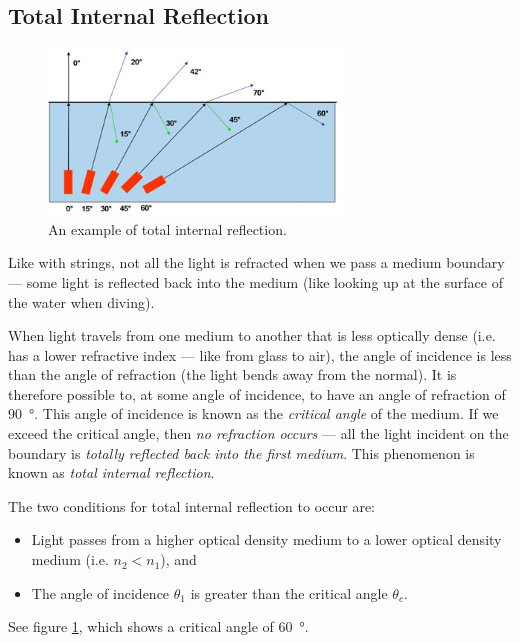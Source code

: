\documentclass[a4paper]{amsbook}
\newcommand\capcite[1]{}
\begin{document}
\subsection{Total Internal Reflection}
\begin{figure}
  \centering
  \includegraphics[width=0.7\textwidth]{criticalangle}
  \caption{An example of total internal reflection. \capcite{http://www.timbercon.com/assets/Uploads/fiber-optic-glossary/images/Critical-Angle.jpg}\label{fig:tire}}
\end{figure}
Like with strings, not all the light is refracted when we pass a medium boundary --- some light is reflected back into
the medium (like looking up at the surface of the water when diving).

When light travels from one medium to another that is less optically dense (i.e. has a lower refractive index --- like from glass to air),
the angle of incidence is less than the angle of refraction (the light bends away from the normal). It is therefore possible to, at some
angle of incidence, to have an angle of refraction of \SI{90}{\degree}. This angle of incidence is known as the \textit{critical angle}
of the medium. If we exceed the critical angle, then \textit{no refraction occurs} --- all the light incident on the boundary is \textit{totally
reflected back into the first medium}. This phenomenon is known as \textit{total internal reflection}.

The two conditions for total internal reflection to occur are:
\begin{itemize}
  \item Light passes from a higher optical density medium to a lower optical density medium (i.e. $ n_2 < n_1 $), and
  \item The angle of incidence $ \theta_1 $ is greater than the critical angle $ \theta_c $.
\end{itemize}

See figure \ref{fig:tire}, which shows a critical angle of \SI{60}{\degree}.
\end{document}
